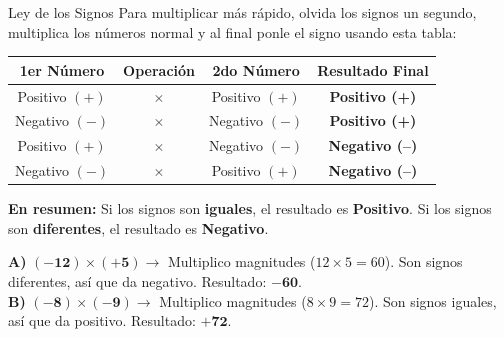 \documentclass[12pt, letterpaper]{article}
\begin{document}
	\begin{truco}{Ley de los Signos}
		Para multiplicar más rápido, olvida los signos un segundo, multiplica los números normal y al final ponle el signo usando esta tabla:
		
		\vspace{0.4cm}
		\begin{center}
			\renewcommand{\arraystretch}{1.5}
			\begin{tabular}{|c c c | c|}
				\hline
				\rowcolor{valblue!20}
				\textbf{1er Número} & \textbf{Operación} & \textbf{2do Número} & \textbf{Resultado Final} \\
				\hline
				Positivo $(+)$ & $\times$ & Positivo $(+)$ & \textbf{\textcolor{valblue}{Positivo (+)}} \\
				Negativo $(-)$ & $\times$ & Negativo $(-)$ & \textbf{\textcolor{valblue}{Positivo (+)}} \\
				\hline
				Positivo $(+)$ & $\times$ & Negativo $(-)$ & \textbf{\textcolor{valred}{Negativo (--)}} \\
				Negativo $(-)$ & $\times$ & Positivo $(+)$ & \textbf{\textcolor{valred}{Negativo (--)}} \\
				\hline
			\end{tabular}
		\end{center}
		\vspace{0.2cm}
		\textbf{En resumen:} Si los signos son \textbf{iguales}, el resultado es \textbf{Positivo}. Si los signos son \textbf{diferentes}, el resultado es \textbf{Negativo}.
	\end{truco}
	
	\begin{ejemplo}
		\textbf{A)} $\mathbf{(-12) \times (+5)} \rightarrow$ Multiplico magnitudes ($12 \times 5 = 60$). Son signos diferentes, así que da negativo. Resultado: $\mathbf{-60}$.\\
		\textbf{B)} $\mathbf{(-8) \times (-9)} \rightarrow$ Multiplico magnitudes ($8 \times 9 = 72$). Son signos iguales, así que da positivo. Resultado: $\mathbf{+72}$.
	\end{ejemplo}
	
\end{document}
